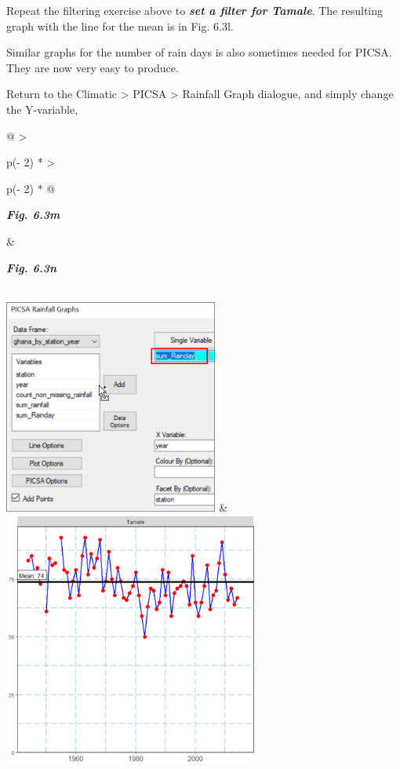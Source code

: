 \documentclass[
  letterpaper,
  DIV=11,
  numbers=noendperiod]{scrreprt}
\begin{document}
Repeat the filtering exercise above to \textbf{\emph{set a filter for
Tamale}}. The resulting graph with the line for the mean is in Fig.
6.3l.

Similar graphs for the number of rain days is also sometimes needed for
PICSA. They are now very easy to produce.

Return to the Climatic \textgreater{} PICSA \textgreater{} Rainfall
Graph dialogue, and simply change the Y-variable,

\begin{longtable}[]{@{}
  >{\raggedright\arraybackslash}p{(\columnwidth - 2\tabcolsep) * }
  >{\raggedright\arraybackslash}p{(\columnwidth - 2\tabcolsep) * }@{}}
\toprule\noalign{}
\begin{minipage}[b]{\linewidth}\raggedright
\textbf{\emph{Fig. 6.3m}}
\end{minipage} & \begin{minipage}[b]{\linewidth}\raggedright
\textbf{\emph{Fig. 6.3n}}
\end{minipage} \\
\midrule\noalign{}
\endhead
\bottomrule\noalign{}
\endlastfoot
\includegraphics[width=2.77738in,height=2.78274in]{figures/Fig6.3m.png}
&
\includegraphics[width=3.28962in,height=3.28215in]{figures/Fig6.3n.png} \\
\end{longtable}
\end{document}
